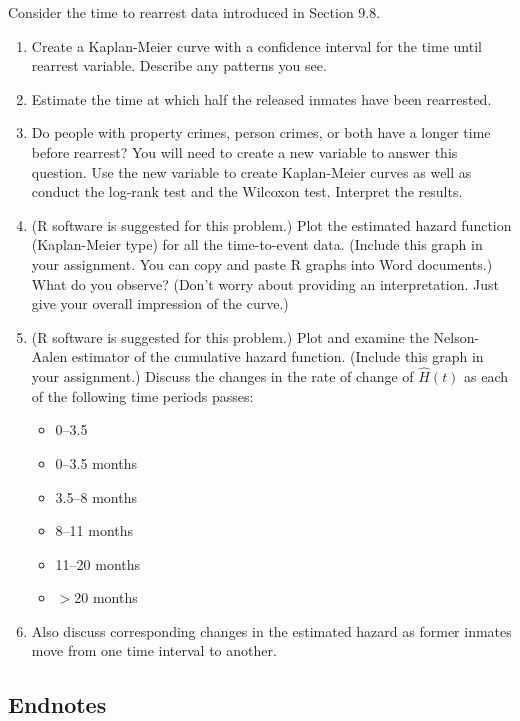 \documentclass[
]{book}
\begin{document}
\begin{enumerate}
Consider the time to rearrest data introduced in Section 9.8.
  \begin{enumerate}
    \item Create a Kaplan-Meier curve with a confidence interval for the time until rearrest variable. Describe any patterns you see.
    \item Estimate the time at which half the released inmates have been rearrested.
    \item Do people with property crimes, person crimes, or both have a longer time before rearrest? You will need to create a new variable to answer this question. Use the new variable to create Kaplan-Meier curves as well as conduct the log-rank test and the Wilcoxon test. Interpret the results.
    \item (R software is suggested for this problem.) Plot the estimated hazard function (Kaplan-Meier type) for all the time-to-event data. (Include this graph in your assignment. You can copy and paste R graphs into Word documents.) What do you observe? (Don’t worry about providing an interpretation. Just give your overall impression of the curve.)
    \item (R software is suggested for this problem.) Plot and examine the Nelson-Aalen estimator of the cumulative hazard function. (Include this graph in your assignment.) Discuss the changes in the rate of change of $\widehat{H}(t)$ as each of the following time periods passes:
      \begin{itemize}
        \item 0–3.5
        \item 0–3.5 months
        \item 3.5–8 months
        \item 8–11 months
        \item 11–20 months
        \item $>$20 months
      \end{itemize}
    \item[] Also discuss corresponding changes in the estimated hazard as former inmates move from one time interval to another.
  \end{enumerate}

\end{enumerate}

\hypertarget{endnotes-5}{%
\subsection*{Endnotes}\label{endnotes-5}}
\end{document}
